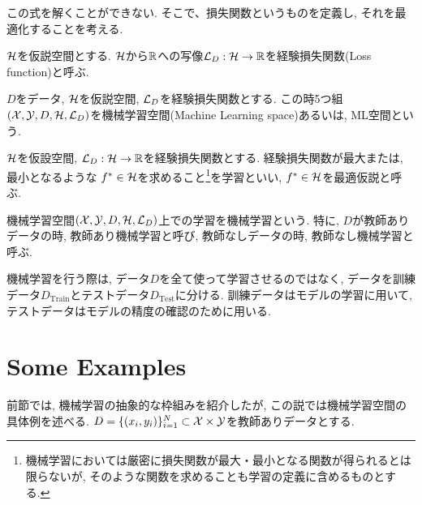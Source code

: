 この式を解くことができない. そこで、損失関数というものを定義し, それを最適化することを考える.
\begin{Defi}[経験損失関数]
    $\mathcal{H}$を仮説空間とする. $\mathcal{H}$から$\mathbb{R}$への写像$\mathcal{L}_{D}:\mathcal{H}\to\mathbb{R}$を経験損失関数(Loss function)と呼ぶ.
\end{Defi}
\begin{Defi}
    $D$をデータ, $\mathcal{H}$を仮説空間, $\mathcal{L}_{D}$を経験損失関数とする. 
    この時5つ組$(\mathcal{X}, \mathcal{Y}, D, \mathcal{H}, \mathcal{L}_{D})$を機械学習空間(Machine Learning space)あるいは, ML空間という.
\end{Defi}
\begin{Defi}[学習, 最適仮説]
    $\mathcal{H}$を仮設空間, $\mathcal{L}_{D}:\mathcal{H}\to\mathbb{R}$を経験損失関数とする. 経験損失関数が最大または, 最小となるような
    $f^*\in\mathcal{H}$を求めること\footnote{機械学習においては厳密に損失関数が最大・最小となる関数が得られるとは限らないが, そのような関数を求めることも学習の定義に含めるものとする. }を学習といい, $f^*\in\mathcal{H}$を最適仮説と呼ぶ.
\end{Defi}
\begin{Defi}[機械学習]
    機械学習空間$(\mathcal{X}, \mathcal{Y}, D, \mathcal{H}, \mathcal{L}_{D})$上での学習を機械学習という. 特に, $D$が教師ありデータの時, 教師あり機械学習と呼び, 
    教師なしデータの時, 教師なし機械学習と呼ぶ.
\end{Defi}
\begin{Rem}[訓練データとテストデータ]
    機械学習を行う際は, データ$D$を全て使って学習させるのではなく, 
    データを訓練データ$D_{\text{Train}}$とテストデータ$D_{\text{Test}}$に分ける. 
    訓練データはモデルの学習に用いて, テストデータはモデルの精度の確認のために用いる. 
\end{Rem}
\section{Some Examples}
前節では, 機械学習の抽象的な枠組みを紹介したが, この説では機械学習空間の具体例を述べる.
$D = \{(x_i, y_i)\}_{i = 1}^{N}\subset\mathcal{X}\times\mathcal{Y}$を教師ありデータとする.

